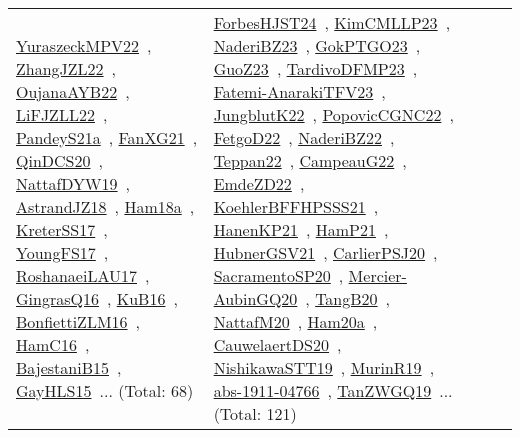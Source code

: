 {\begin{longtable}{lp{3cm}>{\raggedright\arraybackslash}p{6cm}>{\raggedright\arraybackslash}p{6cm}>{\raggedright\arraybackslash}p{8cm}}
\href{../works/YuraszeckMPV22.pdf}{YuraszeckMPV22}~\cite{YuraszeckMPV22}, \href{../works/ZhangJZL22.pdf}{ZhangJZL22}~\cite{ZhangJZL22}, \href{../works/OujanaAYB22.pdf}{OujanaAYB22}~\cite{OujanaAYB22}, \href{../works/LiFJZLL22.pdf}{LiFJZLL22}~\cite{LiFJZLL22}, \href{../works/PandeyS21a.pdf}{PandeyS21a}~\cite{PandeyS21a}, \href{../works/FanXG21.pdf}{FanXG21}~\cite{FanXG21}, \href{../works/QinDCS20.pdf}{QinDCS20}~\cite{QinDCS20}, \href{../works/NattafDYW19.pdf}{NattafDYW19}~\cite{NattafDYW19}, \href{../works/AstrandJZ18.pdf}{AstrandJZ18}~\cite{AstrandJZ18}, \href{../works/Ham18a.pdf}{Ham18a}~\cite{Ham18a}, \href{../works/KreterSS17.pdf}{KreterSS17}~\cite{KreterSS17}, \href{../works/YoungFS17.pdf}{YoungFS17}~\cite{YoungFS17}, \href{../works/RoshanaeiLAU17.pdf}{RoshanaeiLAU17}~\cite{RoshanaeiLAU17}, \href{../works/GingrasQ16.pdf}{GingrasQ16}~\cite{GingrasQ16}, \href{../works/KuB16.pdf}{KuB16}~\cite{KuB16}, \href{../works/BonfiettiZLM16.pdf}{BonfiettiZLM16}~\cite{BonfiettiZLM16}, \href{../works/HamC16.pdf}{HamC16}~\cite{HamC16}, \href{../works/BajestaniB15.pdf}{BajestaniB15}~\cite{BajestaniB15}, \href{../works/GayHLS15.pdf}{GayHLS15}~\cite{GayHLS15}... (Total: 68) & \href{../works/ForbesHJST24.pdf}{ForbesHJST24}~\cite{ForbesHJST24}, \href{../works/KimCMLLP23.pdf}{KimCMLLP23}~\cite{KimCMLLP23}, \href{../works/NaderiBZ23.pdf}{NaderiBZ23}~\cite{NaderiBZ23}, \href{../works/GokPTGO23.pdf}{GokPTGO23}~\cite{GokPTGO23}, \href{../works/GuoZ23.pdf}{GuoZ23}~\cite{GuoZ23}, \href{../works/TardivoDFMP23.pdf}{TardivoDFMP23}~\cite{TardivoDFMP23}, \href{../works/Fatemi-AnarakiTFV23.pdf}{Fatemi-AnarakiTFV23}~\cite{Fatemi-AnarakiTFV23}, \href{../works/JungblutK22.pdf}{JungblutK22}~\cite{JungblutK22}, \href{../works/PopovicCGNC22.pdf}{PopovicCGNC22}~\cite{PopovicCGNC22}, \href{../works/FetgoD22.pdf}{FetgoD22}~\cite{FetgoD22}, \href{../works/NaderiBZ22.pdf}{NaderiBZ22}~\cite{NaderiBZ22}, \href{../works/Teppan22.pdf}{Teppan22}~\cite{Teppan22}, \href{../works/CampeauG22.pdf}{CampeauG22}~\cite{CampeauG22}, \href{../works/EmdeZD22.pdf}{EmdeZD22}~\cite{EmdeZD22}, \href{../works/KoehlerBFFHPSSS21.pdf}{KoehlerBFFHPSSS21}~\cite{KoehlerBFFHPSSS21}, \href{../works/HanenKP21.pdf}{HanenKP21}~\cite{HanenKP21}, \href{../works/HamP21.pdf}{HamP21}~\cite{HamP21}, \href{../works/HubnerGSV21.pdf}{HubnerGSV21}~\cite{HubnerGSV21}, \href{../works/CarlierPSJ20.pdf}{CarlierPSJ20}~\cite{CarlierPSJ20}, \href{../works/SacramentoSP20.pdf}{SacramentoSP20}~\cite{SacramentoSP20}, \href{../works/Mercier-AubinGQ20.pdf}{Mercier-AubinGQ20}~\cite{Mercier-AubinGQ20}, \href{../works/TangB20.pdf}{TangB20}~\cite{TangB20}, \href{../works/NattafM20.pdf}{NattafM20}~\cite{NattafM20}, \href{../works/Ham20a.pdf}{Ham20a}~\cite{Ham20a}, \href{../works/CauwelaertDS20.pdf}{CauwelaertDS20}~\cite{CauwelaertDS20}, \href{../works/NishikawaSTT19.pdf}{NishikawaSTT19}~\cite{NishikawaSTT19}, \href{../works/MurinR19.pdf}{MurinR19}~\cite{MurinR19}, \href{../works/abs-1911-04766.pdf}{abs-1911-04766}~\cite{abs-1911-04766}, \href{../works/TanZWGQ19.pdf}{TanZWGQ19}~\cite{TanZWGQ19}... (Total: 121)\\

\end{longtable}}
